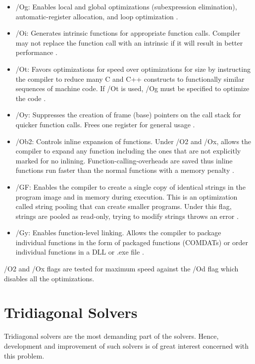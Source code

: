 \documentclass[12pt, oneside]{book}
\theoremstyle{plain}
\theoremstyle{definition}
\begin{document}
\begin{itemize}
\item /Og: Enables local and global optimizations (subexpression elimination), automatic-register allocation, and loop optimization \cite{og}. 
\item /Oi: Generates intrinsic functions for appropriate function calls. Compiler may not replace the function call with an intrinsic if it will result in better performance \cite{oi}.
\item /Ot: Favors optimizations for speed over optimizations for size by instructing the compiler to reduce many C and C++ constructs to functionally similar sequences of machine code. If /Ot is used, /Og must be specified to optimize the code \cite{ot}.
\item /Oy: Suppresses the creation of frame (base) pointers on the call stack for quicker function calls.  Frees one register for general usage \cite{oy}.
\item /Ob2: Controls inline expansion of functions. Under /O2 and /Ox, allows the compiler to expand any function including the ones  that are not explicitly marked for no inlining. Function-calling-overheads are saved thus inline functions run faster than the normal functions with a memory penalty \cite{ob}.
\item /GF:  Enables the compiler to create a single copy of identical strings in the program image and in memory during execution. This is an optimization called string pooling that can create smaller programs. Under this flag, strings are pooled as read-only, trying to modify strings throws an error \cite{gf}.
\item /Gy: Enables function-level linking. Allows the compiler to package individual functions in the form of packaged functions  (COMDATs) or order individual functions in a DLL or .exe file \cite{gy}.
\end{itemize}

/O2 and /Ox flags are tested for maximum speed against the /Od flag which disables all the optimizations.
 
\section{Tridiagonal Solvers}
Tridiagonal solvers are the most demanding part of the solvers. Hence, development and improvement of such solvers is of great interest \cite{terekhov} \cite{chavez} \cite{hofen} \cite{austin} concerned with this problem. 
\end{document}
